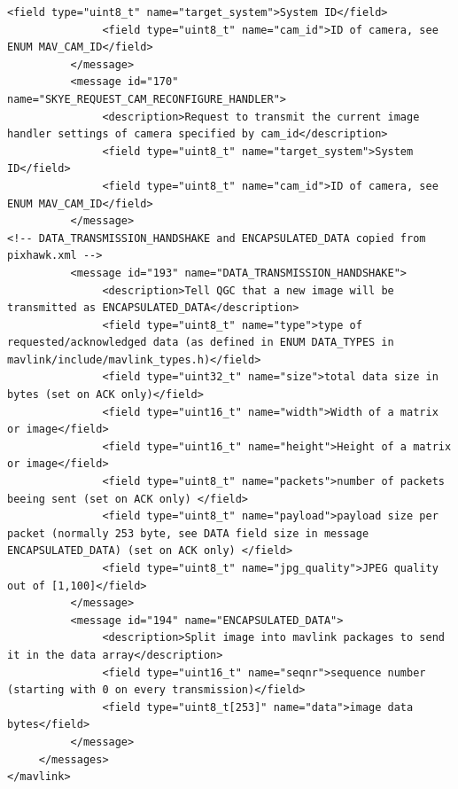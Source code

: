 \begin{lstlisting}[captionpos=b, caption="Definition of \textsc{Skye} specific Mavlink messages", label=app_xml]
               <field type="uint8_t" name="target_system">System ID</field>
               <field type="uint8_t" name="cam_id">ID of camera, see ENUM MAV_CAM_ID</field>
          </message>
          <message id="170" name="SKYE_REQUEST_CAM_RECONFIGURE_HANDLER">
               <description>Request to transmit the current image handler settings of camera specified by cam_id</description>
               <field type="uint8_t" name="target_system">System ID</field>
               <field type="uint8_t" name="cam_id">ID of camera, see ENUM MAV_CAM_ID</field>
          </message>
<!-- DATA_TRANSMISSION_HANDSHAKE and ENCAPSULATED_DATA copied from pixhawk.xml -->
          <message id="193" name="DATA_TRANSMISSION_HANDSHAKE">
               <description>Tell QGC that a new image will be transmitted as ENCAPSULATED_DATA</description>
               <field type="uint8_t" name="type">type of requested/acknowledged data (as defined in ENUM DATA_TYPES in mavlink/include/mavlink_types.h)</field>
               <field type="uint32_t" name="size">total data size in bytes (set on ACK only)</field>
               <field type="uint16_t" name="width">Width of a matrix or image</field>
               <field type="uint16_t" name="height">Height of a matrix or image</field>
               <field type="uint8_t" name="packets">number of packets beeing sent (set on ACK only) </field>
               <field type="uint8_t" name="payload">payload size per packet (normally 253 byte, see DATA field size in message ENCAPSULATED_DATA) (set on ACK only) </field>
               <field type="uint8_t" name="jpg_quality">JPEG quality out of [1,100]</field>
          </message>
          <message id="194" name="ENCAPSULATED_DATA">
               <description>Split image into mavlink packages to send it in the data array</description>
               <field type="uint16_t" name="seqnr">sequence number (starting with 0 on every transmission)</field>
               <field type="uint8_t[253]" name="data">image data bytes</field>
          </message>
     </messages>
</mavlink>
\end{lstlisting}